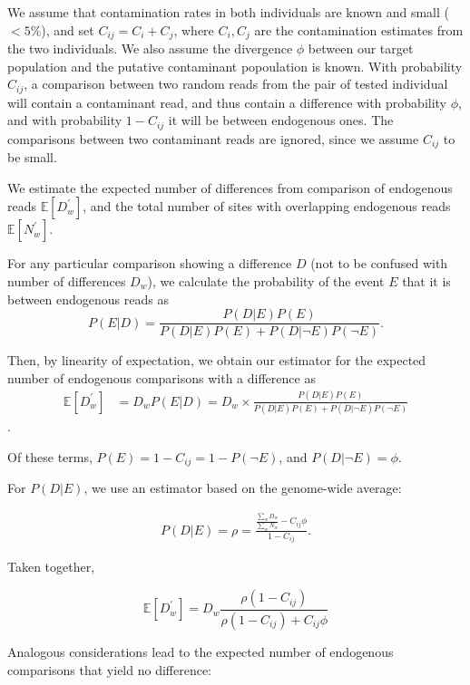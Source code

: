 \documentclass[12pt, letterpaper]{article}
\begin{document}
We assume that contamination rates in both individuals are known and small ($<5\%$), and set $C_{ij} = C_i + C_j$, where $C_i, C_j$ are the contamination estimates from the two individuals. We also assume the divergence $\phi$ between our 
target population and the putative contaminant popoulation is known. With probability $C_{ij}$, a comparison between two random reads from the pair of tested individual will contain a contaminant read, and thus contain a difference with probability $\phi$, and with probability $1 - C_{ij}$ it will be between endogenous ones. The comparisons between two contaminant reads are ignored, since we assume $C_{ij}$ to be small.

We  estimate the expected number of differences from comparison of endogenous reads $\mathbb{E}[D_w^{'}]$, and the total number of sites with overlapping endogenous reads $\mathbb{E}[N_w^{'}]$. 

For any particular comparison showing a difference $D$ (not to be confused with number of differences $D_w$), we calculate the probability of the event $E$ that it is between endogenous reads as 
\begin{equation}
    P(E|D) = \frac{P(D|E)P(E)}{P(D|E)P(E) + P(D| \neg E)P( \neg E)}.
\end{equation}

Then, by linearity of expectation, we obtain our estimator for the expected number of endogenous comparisons with a difference as 
\begin{align}
    \mathbb{E}[D_w^{'}] &= D_{w} P(E|D) = D_{w} \times \frac{P(D|E)P(E)}{P(D|E)P(E) + P(D| \neg E)P( \neg E)}
\end{align}.

Of these terms, $P(E)= 1 -C_{ij} = 1 - P(\neg E)$, and $P(D| \neg E) = \phi$.

For $P(D|E)$, we use an estimator based on the genome-wide average: 

\begin{align}
    P(D|E) = \rho = \frac{\frac{\sum_w D_w}{\sum_w N_w} - C_{ij} \phi}{1 - C_{ij}}.
\end{align}

Taken together, 

\begin{equation}
 \mathbb{E}[D_w^{'}]= D_{w}\frac{\rho (1-C_{ij})}{\rho(1-C_{ij}) + C_{ij}\phi}
 \end{equation}
 
 Analogous considerations lead to the expected number of endogenous comparisons that yield no difference:
 
\end{document}
